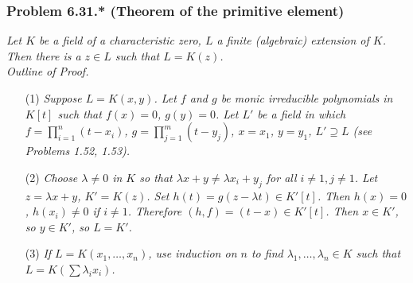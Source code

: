 \documentclass{article}
\begin{document}
\subsubsection*{Problem 6.31.* (Theorem of the primitive element)}
\emph{Let $K$ be a field of a characteristic zero,
$L$ a finite (algebraic) extension of $K$.
Then there is a $z \in L$ such that $L = K(z)$.} \\

\emph{Outline of Proof.}
\begin{enumerate}
\item[(1)]
  \emph{Suppose $L = K(x,y)$.
  Let $f$ and $g$ be monic irreducible polynomials in $K[t]$ such that $f(x) = 0$, $g(y) = 0$.
  Let $L'$ be a field in which
  $f = \prod_{i=1}^{n} (t - x_i)$,
  $g = \prod_{j=1}^{m} (t - y_j)$,
  $x = x_1$, $y = y_1$, $L' \supseteq L$ (see Problems 1.52, 1.53).}

\item[(2)]
  \emph{Choose $\lambda \neq 0$ in $K$ so that
  $\lambda x + y \neq \lambda x_i + y_j$ for all $i \neq 1, j \neq 1$.
  Let $z = \lambda x + y$, $K' = K(z)$.
  Set $h(t) = g(z - \lambda t) \in K'[t]$.
  Then $h(x) = 0$, $h(x_i) \neq 0$ if $i \neq 1$.
  Therefore $(h,f) = (t-x) \in K'[t]$.
  Then $x \in K'$, so $y \in K'$, so $L = K'$.}

\item[(3)]
  \emph{If $L = K(x_1,\ldots,x_n)$, use induction on $n$ to find
  $\lambda_1,\ldots,\lambda_n \in K$ such that
  $L = K(\sum \lambda_i x_i)$.} \\
\end{enumerate}
\end{document}
